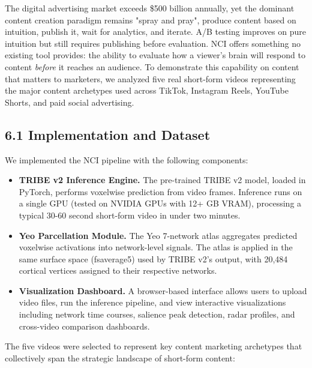 \documentclass[11pt,letterpaper]{article}
\begin{document}
The digital advertising market exceeds \$500 billion annually, yet the dominant content creation paradigm remains "spray and pray", produce content based on intuition, publish it, wait for analytics, and iterate. A/B testing improves on pure intuition but still requires publishing before evaluation. NCI offers something no existing tool provides: the ability to evaluate how a viewer's brain will respond to content \textit{before} it reaches an audience. To demonstrate this capability on content that matters to marketers, we analyzed five real short-form videos representing the major content archetypes used across TikTok, Instagram Reels, YouTube Shorts, and paid social advertising.

\subsection{6.1 Implementation and Dataset}

We implemented the NCI pipeline with the following components:
\begin{itemize}
  \item \textbf{TRIBE v2 Inference Engine.} The pre-trained TRIBE v2 model, loaded in PyTorch, performs voxelwise prediction from video frames. Inference runs on a single GPU (tested on NVIDIA GPUs with 12+ GB VRAM), processing a typical 30-60 second short-form video in under two minutes.
  \item \textbf{Yeo Parcellation Module.} The Yeo 7-network atlas aggregates predicted voxelwise activations into network-level signals. The atlas is applied in the same surface space (fsaverage5) used by TRIBE v2's output, with 20,484 cortical vertices assigned to their respective networks.
  \item \textbf{Visualization Dashboard.} A browser-based interface allows users to upload video files, run the inference pipeline, and view interactive visualizations including network time courses, salience peak detection, radar profiles, and cross-video comparison dashboards.
\end{itemize}
The five videos were selected to represent key content marketing archetypes that collectively span the strategic landscape of short-form content:
\end{document}
